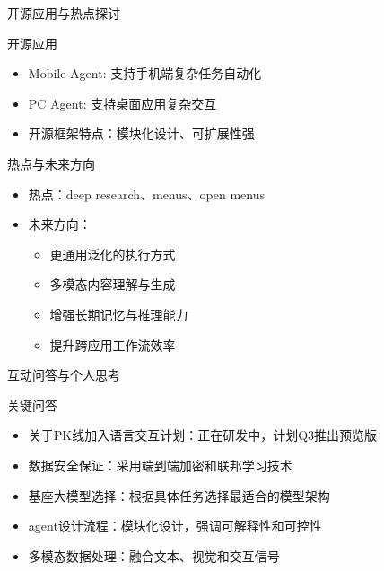 \documentclass{beamer}
\begin{document}
\begin{frame}{开源应用与热点探讨}
    \begin{block}{开源应用}
        \begin{itemize}
            \item Mobile Agent: 支持手机端复杂任务自动化
            \item PC Agent: 支持桌面应用复杂交互
            \item 开源框架特点：模块化设计、可扩展性强
        \end{itemize}
    \end{block}
    
    \begin{block}{热点与未来方向}
        \begin{itemize}
            \item 热点：deep research、menus、open menus
            \item 未来方向：
            \begin{itemize}
                \item 更通用泛化的执行方式
                \item 多模态内容理解与生成
                \item 增强长期记忆与推理能力
                \item 提升跨应用工作流效率
            \end{itemize}
        \end{itemize}
    \end{block}
\end{frame}

\begin{frame}{互动问答与个人思考}
    \begin{block}{关键问答}
        \begin{itemize}
            \item 关于PK线加入语言交互计划：正在研发中，计划Q3推出预览版
            \item 数据安全保证：采用端到端加密和联邦学习技术
            \item 基座大模型选择：根据具体任务选择最适合的模型架构
            \item agent设计流程：模块化设计，强调可解释性和可控性
            \item 多模态数据处理：融合文本、视觉和交互信号
        \end{itemize}
    \end{block}
    

\end{frame}
\end{document}
